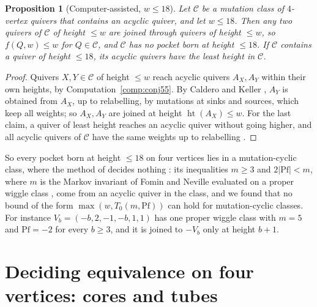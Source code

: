 \documentclass[11pt]{amsart}
\newtheorem{proposition}[theorem]{Proposition}
\theoremstyle{definition}
\theoremstyle{remark}
\newcommand{\htt}{\operatorname{ht}}
\begin{document}
\begin{proposition}[Computer-assisted, $w\le18$]\label{prop:acyclicf}
Let $\mathcal C$ be a mutation class of $4$-vertex quivers that contains an acyclic quiver, and let $w\le18$. Then any two quivers of $\mathcal C$ of height $\le w$ are joined through quivers of height $\le w$, so $f(Q,w)\le w$ for $Q\in\mathcal C$, and $\mathcal C$ has no pocket born at height $\le18$. If $\mathcal C$ contains a quiver of height $\le18$, its acyclic quivers have the least height in $\mathcal C$.
\end{proposition}
\begin{proof}
Quivers $X,Y\in\mathcal C$ of height $\le w$ reach acyclic quivers $A_X,A_Y$ within their own heights, by Computation~\ref{comp:conj55}. By Caldero and Keller \cite[Cor.~4]{CK}, $A_Y$ is obtained from $A_X$, up to relabelling, by mutations at sinks and sources, which keep all weights; so $A_X,A_Y$ are joined at height $\htt(A_X)\le w$. For the last claim, a quiver of least height reaches an acyclic quiver without going higher, and all acyclic quivers of $\mathcal C$ have the same weights up to relabelling \cite{CK}.
\end{proof}

So every pocket born at height $\le18$ on four vertices lies in a mutation-cyclic class, where the method of \cite{AHJL} decides nothing \cite[Cor.~5.7]{AHJL}: its inequalities $m\ge3$ and $2|\mathrm{Pf}|<m$, where $m$ is the Markov invariant of Fomin and Neville evaluated on a proper wiggle class \cite[\S2]{AHJL}, come from an acyclic quiver in the class, and we found that no bound of the form $\max(w,T_0(m,\mathrm{Pf}))$ can hold for mutation-cyclic classes. For instance $V_b=(-b,2,-1,-b,1,1)$ has one proper wiggle class with $m=5$ and $\mathrm{Pf}=-2$ for every $b\ge3$, and it is joined to $-V_b$ only at height $b+1$.

\section{Deciding equivalence on four vertices: cores and tubes}\label{sec:cores}
\end{document}
